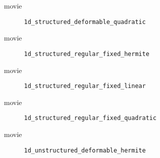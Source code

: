 

%
\begin{frame}{movie}
  \begin{figure}[h!]
    \caption{\lstinline{1d_structured_deformable_quadratic}}
  \end{figure} 
\end{frame}



%
\begin{frame}{movie}
  \begin{figure}[h!]
    \caption{\lstinline{1d_structured_regular_fixed_hermite}}
  \end{figure} 
\end{frame}



%
\begin{frame}{movie}
  \begin{figure}[h!]
    \caption{\lstinline{1d_structured_regular_fixed_linear}}
  \end{figure} 
\end{frame}



%
\begin{frame}{movie}
  \begin{figure}[h!]
    \caption{\lstinline{1d_structured_regular_fixed_quadratic}}
  \end{figure} 
\end{frame}



%
\begin{frame}{movie}
  \begin{figure}[h!]
    \caption{\lstinline{1d_unstructured_deformable_hermite}}
  \end{figure} 
\end{frame}

